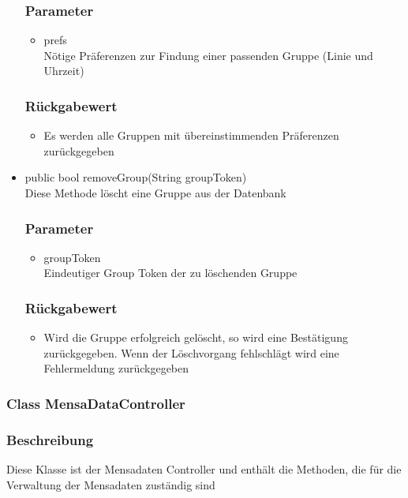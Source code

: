 \documentclass[a4paper]{scrreprt}
\begin{document}
\begin{addmargin}[25pt]{0pt}
\begin{itemize}
	\subsubsection*{Parameter}
	\begin{itemize}
	\item prefs \\
		Nötige Präferenzen zur Findung einer passenden Gruppe (Linie und Uhrzeit)
	\end{itemize}
	\subsubsection*{Rückgabewert}
	\begin{itemize}
	\item Es werden alle Gruppen mit übereinstimmenden Präferenzen zurückgegeben
	\end{itemize}

\item public bool removeGroup(String groupToken)\\
	Diese Methode löscht eine Gruppe aus der Datenbank
	\subsubsection*{Parameter}
	\begin{itemize}
	\item groupToken \\
		Eindeutiger Group Token der zu löschenden Gruppe
	\end{itemize}
	\subsubsection*{Rückgabewert}
	\begin{itemize}
	\item Wird die Gruppe erfolgreich gelöscht, so wird eine Bestätigung zurückgegeben. Wenn der Löschvorgang fehlschlägt wird eine Fehlermeldung zurückgegeben
	\end{itemize}
\end{itemize}
\end{addmargin}

\subsubsection{Class MensaDataController}
\subsubsection*{Beschreibung}
Diese Klasse ist der Mensadaten Controller und enthält die Methoden, die für die Verwaltung der Mensadaten zuständig sind
\end{document}
